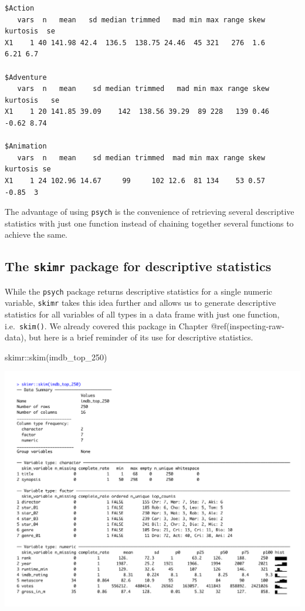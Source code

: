 \documentclass[
  letterpaper,
]{krantz}
\makeatletter
\newenvironment{Shaded}{\begin{snugshade}}{\end{snugshade}}
\newcommand{\FunctionTok}[1]{\textcolor[rgb]{0.28,0.35,0.67}{#1}}
\newcommand{\NormalTok}[1]{\textcolor[rgb]{0.00,0.23,0.31}{#1}}
\newcommand{\SpecialCharTok}[1]{\textcolor[rgb]{0.37,0.37,0.37}{#1}}
\newenvironment{kframe}{%
\medskip{}
\setlength{\fboxsep}{.8em}
 \def\at@end@of@kframe{}%
 \ifinner\ifhmode%
  \def\at@end@of@kframe{\end{minipage}}%
  \begin{minipage}{\columnwidth}%
 \fi\fi%
 \def\FrameCommand##1{\hskip\@totalleftmargin \hskip-\fboxsep
 \colorbox{shadecolor}{##1}\hskip-\fboxsep
     \hskip-\linewidth \hskip-\@totalleftmargin \hskip\columnwidth}%
 \MakeFramed {\advance\hsize-\width
   \@totalleftmargin\z@ \linewidth\hsize
   \@setminipage}}%
 {\par\unskip\endMakeFramed%
 \at@end@of@kframe}
\renewenvironment{Shaded}{\begin{kframe}}{\end{kframe}}
\makeatother
\begin{document}
\begin{verbatim}
$Action
   vars  n   mean   sd median trimmed   mad min max range skew kurtosis  se
X1    1 40 141.98 42.4  136.5  138.75 24.46  45 321   276  1.6     6.21 6.7

$Adventure
   vars  n   mean    sd median trimmed   mad min max range skew kurtosis   se
X1    1 20 141.85 39.09    142  138.56 39.29  89 228   139 0.46    -0.62 8.74

$Animation
   vars  n   mean    sd median trimmed  mad min max range skew kurtosis se
X1    1 24 102.96 14.67     99     102 12.6  81 134    53 0.57    -0.85  3
\end{verbatim}

The advantage of using \texttt{psych} is the convenience of retrieving
several descriptive statistics with just one function instead of
chaining together several functions to achieve the same.

\subsection{\texorpdfstring{The \texttt{skimr} package for descriptive
statistics}{The skimr package for descriptive statistics}}\label{the-skimr-package-for-descriptive-statistics}

While the \texttt{psych} package returns descriptive statistics for a
single numeric variable, \texttt{skimr} takes this idea further and
allows us to generate descriptive statistics for all variables of all
types in a data frame with just one function, i.e.~\texttt{skim()}. We
already covered this package in Chapter @ref(inspecting-raw-data), but
here is a brief reminder of its use for descriptive statistics.

\begin{Shaded}
\begin{Highlighting}[]
\NormalTok{skimr}\SpecialCharTok{::}\FunctionTok{skim}\NormalTok{(imdb\_top\_250)}
\end{Highlighting}
\end{Shaded}

\includegraphics{images/chapter_08_img/output_skim.png}
\end{document}

